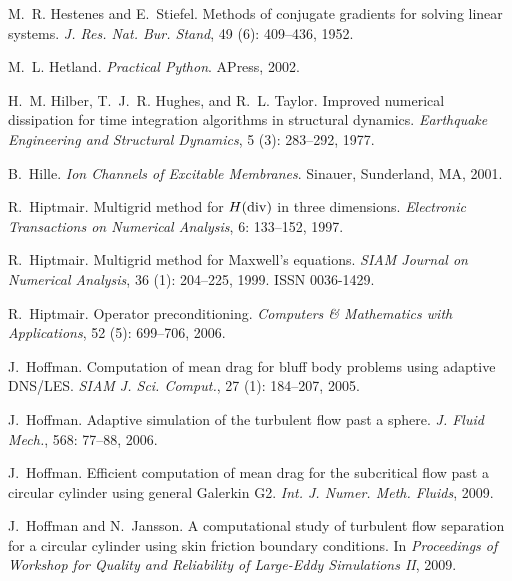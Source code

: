 \begin{thebibliography}{467}
M.~R. Hestenes and E.~Stiefel.
\newblock Methods of conjugate gradients for solving linear systems.
\newblock \emph{J. Res. Nat. Bur. Stand}, 49 (6): 409--436,
  1952.

M.~L. Hetland.
\newblock \emph{Practical Python}.
\newblock APress, 2002.

H.~M. Hilber, T.~J.~R. Hughes, and R.~L. Taylor.
\newblock Improved numerical dissipation for time integration algorithms in
  structural dynamics.
\newblock \emph{Earthquake Engineering and Structural Dynamics}, 5
  (3): 283--292, 1977.

B.~Hille.
\newblock \emph{Ion Channels of Excitable Membranes}.
\newblock Sinauer, Sunderland, MA, 2001.

R.~Hiptmair.
\newblock Multigrid method for {$H({\rm div})$} in three dimensions.
\newblock \emph{Electronic Transactions on Numerical Analysis}, 6:
  133--152, 1997.

R.~Hiptmair.
\newblock Multigrid method for {M}axwell's equations.
\newblock \emph{SIAM Journal on Numerical Analysis}, 36 (1):
  204--225, 1999.
\newblock ISSN 0036-1429.

R.~Hiptmair.
\newblock Operator preconditioning.
\newblock \emph{Computers \& Mathematics with Applications}, 52
  (5): 699--706, 2006.

J.~Hoffman.
\newblock Computation of mean drag for bluff body problems using adaptive
  DNS/LES.
\newblock \emph{SIAM J. Sci. Comput.}, 27 (1): 184--207,
  2005.

J.~Hoffman.
\newblock Adaptive simulation of the turbulent flow past a sphere.
\newblock \emph{J. Fluid Mech.}, 568: 77--88, 2006.

J.~Hoffman.
\newblock Efficient computation of mean drag for the subcritical flow past a
  circular cylinder using general {G}alerkin {G2}.
\newblock \emph{Int. J. Numer. Meth. Fluids}, 2009.

J.~Hoffman and N.~Jansson.
\newblock A computational study of turbulent flow separation for a circular
  cylinder using skin friction boundary conditions.
\newblock In \emph{Proceedings of Workshop for Quality and Reliability of
  Large-Eddy Simulations II}, 2009.


\end{thebibliography}
